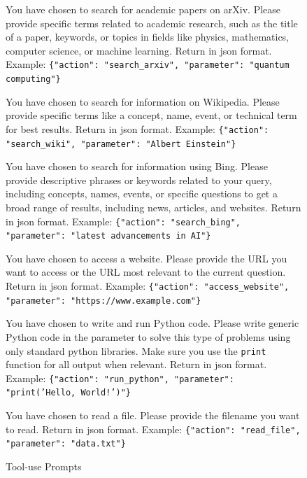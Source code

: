 \documentclass{article}
\begin{document}
\begin{figure}[htbp]
\centering
\caption{Tool-use Prompts}

\begin{tcolorbox}[title={search\_arxiv}]
You have chosen to search for academic papers on arXiv. Please provide specific terms related to academic research, such as the title of a paper, keywords, or topics in fields like physics, mathematics, computer science, or machine learning. Return in json format. Example: \texttt{\{"action": "search\_arxiv", "parameter": "quantum computing"\}}
\end{tcolorbox}

\begin{tcolorbox}[title={search\_wiki}]
You have chosen to search for information on Wikipedia. Please provide specific terms like a concept, name, event, or technical term for best results. Return in json format. Example: \texttt{\{"action": "search\_wiki", "parameter": "Albert Einstein"\}}
\end{tcolorbox}

\begin{tcolorbox}[title={search\_bing}]
You have chosen to search for information using Bing. Please provide descriptive phrases or keywords related to your query, including concepts, names, events, or specific questions to get a broad range of results, including news, articles, and websites. Return in json format. Example: \texttt{\{"action": "search\_bing", "parameter": "latest advancements in AI"\}}
\end{tcolorbox}

\begin{tcolorbox}[title={access\_website}]
You have chosen to access a website. Please provide the URL you want to access or the URL most relevant to the current question. Return in json format. Example: \texttt{\{"action": "access\_website", "parameter": "https://www.example.com"\}}
\end{tcolorbox}

\begin{tcolorbox}[title={run\_python}]
You have chosen to write and run Python code. Please write generic Python code in the parameter to solve this type of problems using only standard python libraries. Make sure you use the \texttt{print} function for all output when relevant. Return in json format. Example: \texttt{\{"action": "run\_python", "parameter": "print('Hello, World!')"\}}
\end{tcolorbox}

\begin{tcolorbox}[title={read\_file}]
You have chosen to read a file. Please provide the filename you want to read. Return in json format. Example: \texttt{\{"action": "read\_file", "parameter": "data.txt"\}}
\end{tcolorbox}
\label{actions_1}
\end{figure}
\end{document}
